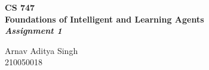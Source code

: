 \begin{titlepage}
    \begin{center}
        \vspace*{1cm}
 
        \Huge
        \textbf{CS 747} \\
        \huge
        \textbf{Foundations of Intelligent and Learning Agents \\ \textit{Assignment 1}}
        
        \Large
        \vspace{0.5cm}
        Arnav Aditya Singh\\210050018
    \end{center}
\end{titlepage}

